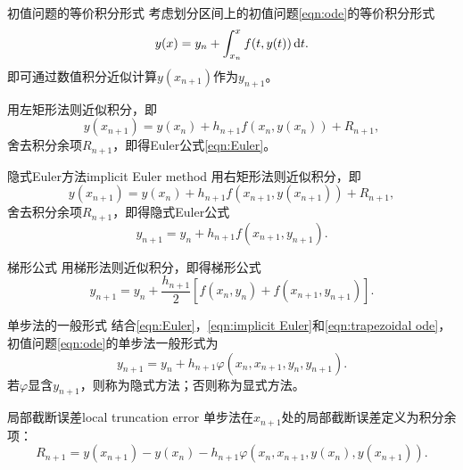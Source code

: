 \begin{theorem}
    {初值问题的等价积分形式}{}
    考虑划分区间上的初值问题\eqref{eqn:ode}的等价积分形式
    \[
        y(x)=y_n+\int_{x_n}^xf(t,y(t))\mathop{}\!\mathrm{d} t.
    \]
    即可通过数值积分近似计算$y(x_{n+1})$作为$y_{n+1}$。
\end{theorem}

\begin{corollary}
    用左矩形法则近似积分，即
    \[
        y(x_{n+1})=y(x_n)+h_{n+1}f(x_n,y(x_n))+R_{n+1},
    \]
    舍去积分余项$R_{n+1}$，即得Euler公式\eqref{eqn:Euler}。
\end{corollary}

\begin{example}
    {隐式Euler方法}{implicit Euler method}
    用右矩形法则近似积分，即
    \[
        y(x_{n+1})=y(x_n)+h_{n+1}f(x_{n+1},y(x_{n+1}))+R_{n+1},
    \]
    舍去积分余项$R_{n+1}$，即得隐式Euler公式
    \begin{equation}
        \label{eqn:implicit Euler}
        y_{n+1}=y_n+h_{n+1}f(x_{n+1},y_{n+1}).
    \end{equation}
\end{example}

\begin{example}
    {梯形公式}{}
    用梯形法则近似积分，即得梯形公式
    \begin{equation}
        \label{eqn:trapezoidal ode}
        y_{n+1}=y_n+\frac{h_{n+1}}2[f(x_n,y_n)+f(x_{n+1},y_{n+1})].
    \end{equation}
\end{example}

\begin{definition}
    {单步法的一般形式}{}
    结合\eqref{eqn:Euler}，\eqref{eqn:implicit Euler}和\eqref{eqn:trapezoidal ode}，初值问题\eqref{eqn:ode}的单步法一般形式为
    \[
        y_{n+1}=y_n+h_{n+1}\varphi(x_n,x_{n+1},y_n,y_{n+1}).
    \]
    若$\varphi$显含$y_{n+1}$，则称为隐式方法；否则称为显式方法。
\end{definition}

\begin{definition}
    {局部截断误差}{local truncation error}
    单步法在$x_{n+1}$处的局部截断误差定义为积分余项：
    \[
        R_{n+1}=y(x_{n+1})-y(x_n)-h_{n+1}\varphi(x_n,x_{n+1},y(x_n),y(x_{n+1})).
    \]
\end{definition}


